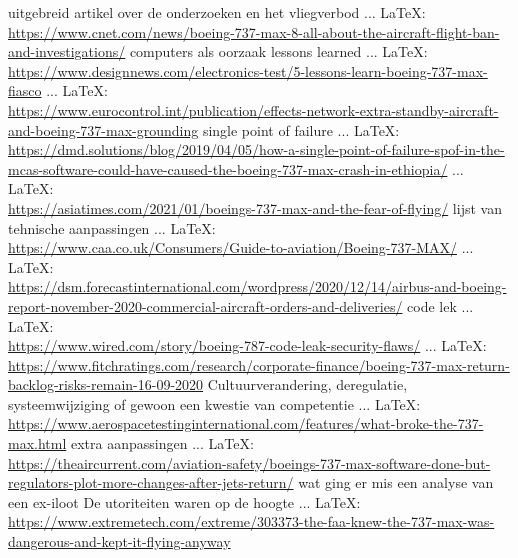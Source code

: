 \begin{thebibliography}{99}
uitgebreid artikel over de onderzoeken en het vliegverbod
 ... \LaTeX:\\ \url{https://www.cnet.com/news/boeing-737-max-8-all-about-the-aircraft-flight-ban-and-investigations/}
computers als oorzaak
lessons learned
 ... \LaTeX:\\ \url{https://www.designnews.com/electronics-test/5-lessons-learn-boeing-737-max-fiasco}
 ... \LaTeX:\\ \url{https://www.eurocontrol.int/publication/effects-network-extra-standby-aircraft-and-boeing-737-max-grounding}
single point of failure
 ... \LaTeX:\\ \url{https://dmd.solutions/blog/2019/04/05/how-a-single-point-of-failure-spof-in-the-mcas-software-could-have-caused-the-boeing-737-max-crash-in-ethiopia/}
 ... \LaTeX:\\ \url{https://asiatimes.com/2021/01/boeings-737-max-and-the-fear-of-flying/}
lijst van tehnische aanpassingen
 ... \LaTeX:\\ \url{https://www.caa.co.uk/Consumers/Guide-to-aviation/Boeing-737-MAX/}
 ... \LaTeX:\\ \url{https://dsm.forecastinternational.com/wordpress/2020/12/14/airbus-and-boeing-report-november-2020-commercial-aircraft-orders-and-deliveries/}
code lek
 ... \LaTeX:\\ \url{https://www.wired.com/story/boeing-787-code-leak-security-flaws/}
 ... \LaTeX:\\ \url{https://www.fitchratings.com/research/corporate-finance/boeing-737-max-return-backlog-risks-remain-16-09-2020}
Cultuurverandering, deregulatie, systeemwijziging of gewoon een kwestie van competentie
 ... \LaTeX:\\ \url{https://www.aerospacetestinginternational.com/features/what-broke-the-737-max.html}
extra aanpassingen
 ... \LaTeX:\\ \url{https://theaircurrent.com/aviation-safety/boeings-737-max-software-done-but-regulators-plot-more-changes-after-jets-return/}
wat ging er mis een analyse van een ex-iloot
De utoriteiten waren op de hoogte
 ... \LaTeX:\\ \url{https://www.extremetech.com/extreme/303373-the-faa-knew-the-737-max-was-dangerous-and-kept-it-flying-anyway}

\end{thebibliography}
